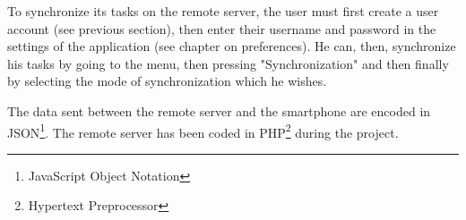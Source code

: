 
\noindent To synchronize its tasks on the remote server, the user must first create a user account (see previous section), then enter their username and password in the settings of the application (see chapter on preferences). He can, then, synchronize his tasks by going to the menu, then pressing "Synchronization" and then finally by selecting the mode of synchronization which he wishes.

\noindent The data sent between the remote server and the smartphone are encoded in JSON\protect\footnote{JavaScript Object Notation}. The remote server has been coded in PHP\protect\footnote{Hypertext Preprocessor} during the project.

\vspace{3cm}

\clearpage
